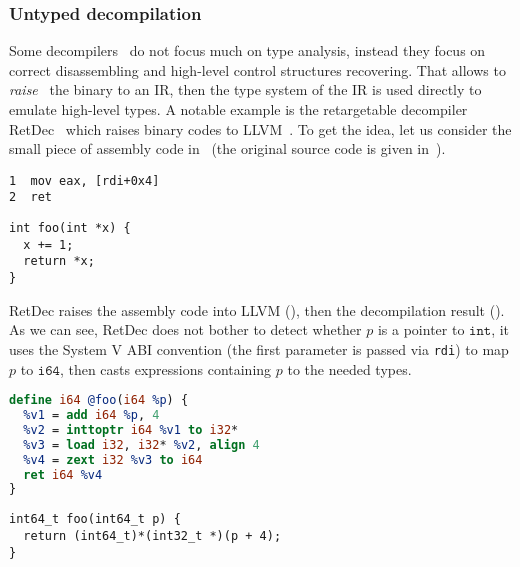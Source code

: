 \documentclass[compsoc,conference,a4paper,10pt,times]{IEEEtran}
\begin{document}


\subsubsection*{Untyped decompilation}
Some decompilers~\cite{noauthor_snowman_nodate,kroustek_retdec_2017} do not focus much on type analysis, 
instead they focus on correct disassembling and high-level control structures recovering. That allows to 
\emph{raise}~\cite{goodman_lifting_2018,yadavalli_raising_2019} the binary to an IR, then the type
system of the IR is used directly to emulate high-level types. A notable example is the retargetable 
decompiler RetDec~\cite{kroustek_retdec_2017} which raises binary codes to LLVM~\cite{lattner_llvm_2004}.
To get the idea, let us consider the small piece of assembly code in~ (the original source code 
is given in~).
\begin{lstlisting}[language={[x86masm]Assembler},caption={Pointer increment then dereference},label={lst:derefasm}]
1  mov eax, [rdi+0x4]
2  ret
\end{lstlisting}
\begin{lstlisting}[style={c},caption={Pointer increment then dereference (source)},label={lst:derefc}]
int foo(int *x) {
  x += 1;
  return *x;
}
\end{lstlisting}
RetDec raises the assembly code into LLVM (), 
then the decompilation result (). As we can see, RetDec does not bother to detect whether $p$ is a pointer to $\mathtt{int}$, 
it uses the System V ABI convention (the first parameter is passed via 
\texttt{\small rdi}) to map $p$ to $\mathtt{i64}$, then casts expressions containing $p$ to the needed types.
\begin{lstlisting}[language={LLVM}, caption={Pointer increment then dereference (LLVM)}, label={lst:derefllvm}]
define i64 @foo(i64 %p) {
  %v1 = add i64 %p, 4
  %v2 = inttoptr i64 %v1 to i32*
  %v3 = load i32, i32* %v2, align 4
  %v4 = zext i32 %v3 to i64
  ret i64 %v4
}
\end{lstlisting}
\begin{lstlisting}[style={c},caption={Pointer increment then dereference (decompilation)},label={lst:derefdec}]
int64_t foo(int64_t p) {
  return (int64_t)*(int32_t *)(p + 4);
}
\end{lstlisting}
\end{document}
